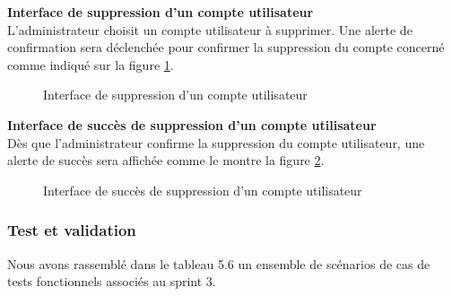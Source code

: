 \newpage
\textbf{Interface de suppression d’un compte utilisateur}\\
L'administrateur choisit un compte utilisateur à supprimer. Une alerte de confirmation sera déclenchée pour confirmer la suppression du compte concerné comme indiqué sur la figure \ref{fig:deleteUser}.
\begin{figure}[htpb]
    \centering
    \caption{Interface de suppression d’un compte utilisateur}
    \label{fig:deleteUser}
    \end{figure}

\textbf{Interface de succès de suppression d’un compte utilisateur}\\
Dès que l’administrateur confirme la suppression du compte utilisateur, une alerte de succès sera affichée
comme le montre la figure \ref{fig:successdeleteUser}.
\begin{figure}[htpb]
    \centering
    \caption{Interface de succès de suppression d’un compte utilisateur}
    \label{fig:successdeleteUser}
    \end{figure}
\subsubsection{Test et validation}
Nous avons rassemblé dans le tableau 5.6 un ensemble de scénarios de cas de tests fonctionnels associés au sprint 3.
\newpage
{}

